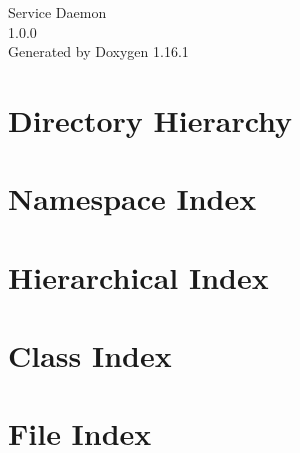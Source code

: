 \documentclass[twoside]{book}
\newcommand{\+}{\discretionary{\mbox{\scriptsize$\hookleftarrow$}}{}{}}
\newcommand{\clearemptydoublepage}{%
    \newpage{\pagestyle{empty}\cleardoublepage}%
  }
\begin{document}
  \raggedbottom
    \hypersetup{pageanchor=false,
                bookmarksnumbered=true,
                pdfencoding=unicode
               }
  \begin{titlepage}
  \vspace*{7cm}
  \begin{center}%
  {\Large Service Daemon}\\
  [1ex]\large 1.\+0.\+0 \\
  \vspace*{1cm}
  {\large Generated by Doxygen 1.16.1}\\
  \end{center}
  \end{titlepage}
  \clearemptydoublepage
  \tableofcontents
  \clearemptydoublepage
  \hypersetup{pageanchor=true}






\chapter{Directory Hierarchy}

\chapter{Namespace Index}

\chapter{Hierarchical Index}

\chapter{Class Index}

\chapter{File Index}

\end{document}
